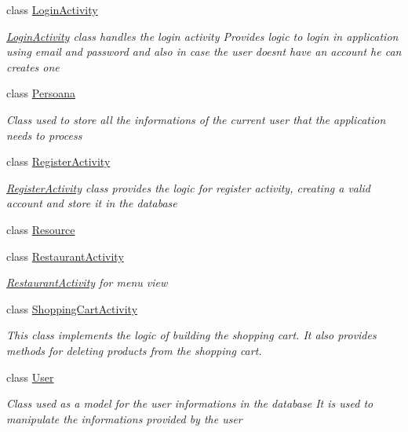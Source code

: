 \begin{DoxyCompactItemize}
class \hyperlink{classst_delivery_1_1_login_activity}{Login\+Activity}
\begin{DoxyCompactList}\small\item\em \hyperlink{classst_delivery_1_1_login_activity}{Login\+Activity} class handles the login activity Provides logic to login in application using email and password and also in case the user doesn\textquotesingle{}t have an account he can creates one \end{DoxyCompactList}\item 
class \hyperlink{classst_delivery_1_1_persoana}{Persoana}
\begin{DoxyCompactList}\small\item\em Class used to store all the informations of the current user that the application needs to process \end{DoxyCompactList}\item 
class \hyperlink{classst_delivery_1_1_register_activity}{Register\+Activity}
\begin{DoxyCompactList}\small\item\em \hyperlink{classst_delivery_1_1_register_activity}{Register\+Activity} class provides the logic for register activity, creating a valid account and store it in the database \end{DoxyCompactList}\item 
class \hyperlink{classst_delivery_1_1_resource}{Resource}
\item 
class \hyperlink{classst_delivery_1_1_restaurant_activity}{Restaurant\+Activity}
\begin{DoxyCompactList}\small\item\em \hyperlink{classst_delivery_1_1_restaurant_activity}{Restaurant\+Activity} for menu view \end{DoxyCompactList}\item 
class \hyperlink{classst_delivery_1_1_shopping_cart_activity}{Shopping\+Cart\+Activity}
\begin{DoxyCompactList}\small\item\em This class implements the logic of building the shopping cart. It also provides methods for deleting products from the shopping cart. \end{DoxyCompactList}\item 
class \hyperlink{classst_delivery_1_1_user}{User}
\begin{DoxyCompactList}\small\item\em Class used as a model for the user informations in the database It is used to manipulate the informations provided by the user \end{DoxyCompactList}\end{DoxyCompactItemize}
